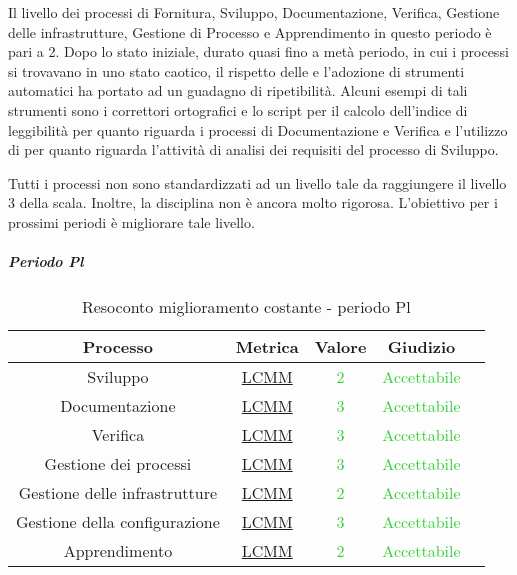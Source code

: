 		Il livello  dei processi di Fornitura, Sviluppo, Documentazione, Verifica, Gestione delle infrastrutture, Gestione di Processo e Apprendimento in questo periodo è pari a 2. Dopo lo stato iniziale, durato quasi fino a metà periodo, in cui i processi si trovavano in uno stato caotico, il rispetto delle \ndpvuno{} e l'adozione di strumenti automatici ha portato ad un guadagno di ripetibilità. Alcuni esempi di tali strumenti sono i correttori ortografici e lo script per il calcolo dell'indice di leggibilità per quanto riguarda i processi di Documentazione e Verifica e l'utilizzo di  per quanto riguarda l'attività di analisi dei requisiti del processo di Sviluppo.
	
	
		Tutti i processi non sono standardizzati ad un livello tale da raggiungere il livello 3 della scala. Inoltre, la disciplina non è ancora molto rigorosa. L'obiettivo per i prossimi periodi è migliorare tale livello.
	\subparagraph{Periodo Pl}
	
	
	\begin{table}[H]
		\centering


			\begin{tabular}{c | c | c | c | c}
				\hline
				\textbf{Processo}          & \textbf{Metrica}                & \textbf{Valore}                            & \textbf{Giudizio}                           \\ \hline
				Sviluppo             & \hyperref[MMC]{LCMM}   & \textcolor{LimeGreen}{2}          & \textcolor{LimeGreen}{Accettabile} \\
				Documentazione       & \hyperref[MMC]{LCMM}   & \textcolor{LimeGreen}{3}          & \textcolor{LimeGreen}{Accettabile} \\
				Verifica            & \hyperref[MMC]{LCMM}   & \textcolor{LimeGreen}{3}          & \textcolor{LimeGreen}{Accettabile} \\
				Gestione dei processi       & \hyperref[MMC]{LCMM}   & \textcolor{LimeGreen}{3}          & \textcolor{LimeGreen}{Accettabile} \\
				Gestione delle infrastrutture  & \hyperref[MMC]{LCMM}   & \textcolor{LimeGreen}{2}          & \textcolor{LimeGreen}{Accettabile} \\
				Gestione della configurazione   & \hyperref[MMC]{LCMM}   & \textcolor{LimeGreen}{3}          & \textcolor{LimeGreen}{Accettabile} \\
				Apprendimento             & \hyperref[MMC]{LCMM}   & \textcolor{LimeGreen}{2}          & \textcolor{LimeGreen}{Accettabile} \\
				
				
\hline
		\end{tabular}
		\caption{Resoconto miglioramento costante - periodo Pl}
		\label{tab:resoconto_obiettivo_miglioramento_costante_PPL}
	\end{table}

